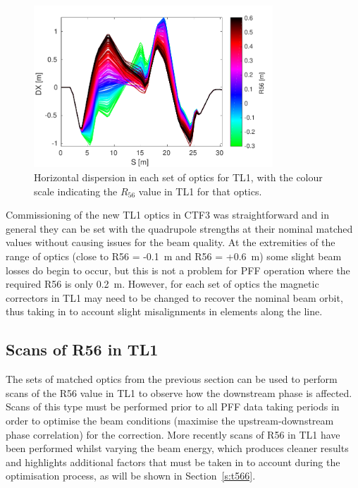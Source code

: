 \begin{figure}
  \centering
  \includegraphics[width=0.8\textwidth]{Figures/propagation/DX}
  \caption{Horizontal dispersion in each set of optics for TL1, with the colour scale indicating the \(R_{56}\) value in TL1 for that optics.}
  \label{f:tl1DX}
\end{figure}

Commissioning of the new TL1 optics in CTF3 was straightforward and in general they can be set with the quadrupole strengths at their nominal matched values without causing issues for the beam quality. At the extremities of the range of optics (close to R56 = -0.1~m and R56 = +0.6~m) some slight beam losses do begin to occur, but this is not a problem for PFF operation where the required R56 is only 0.2~m. However, for each set of optics the magnetic correctors in TL1 may need to be changed to recover the nominal beam orbit, thus taking in to account slight misalignments in elements along the line.

\subsection{Scans of R56 in TL1}
\label{ss:r56Scans}

The sets of matched optics from the previous section can be used to perform scans of the R56 value in TL1 to observe how the downstream phase is affected. Scans of this type must be performed prior to all PFF data taking periods in order to optimise the beam conditions (maximise the upstream-downstream phase correlation) for the correction. More recently scans of R56 in TL1 have been performed whilst varying the beam energy, which produces cleaner results and highlights additional factors that must be taken in to account during the optimisation process, as will be shown in Section~\ref{s:t566}. 

